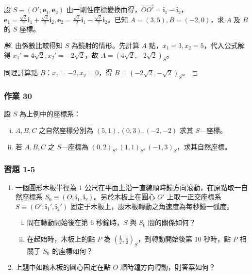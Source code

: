 \begin{example}[例 12]
設 $S \equiv (O'; \mathbf{e}_1, \mathbf{e}_2)$ 由一剛性座標變換而得，$\vec{OO'} = \mathbf{i}_1 - \mathbf{i}_2$，$\mathbf{e}_1 = \frac{\sqrt{2}}{2}\mathbf{i}_1 + \frac{\sqrt{2}}{2}\mathbf{i}_2, \mathbf{e}_2 = \frac{\sqrt{2}}{2}\mathbf{i}_1 - \frac{\sqrt{2}}{2}\mathbf{i}_2$。已知 $A = (3, 5), B = (-2, 0)$，求 $A$ 及 $B$ 的 $S$ 座標。
\end{example}

\begin{proof}[解]
由係數比較得知 $S$ 為鏡射的情形。先計算 $A$ 點，$x_1 = 3, x_2 = 5$，代入公式解得 $x_1' = 4\sqrt{2}, x_2' = -2\sqrt{2}$，故 $A = (4\sqrt{2}, -2\sqrt{2})_S$。

同理計算點 $B$：$x_1 = -2, x_2 = 0$，得 $B = (-2\sqrt{2}, -\sqrt{2})_S$。
\end{proof}

\subsubsection*{作業 30}
設 $S$ 為上例中的座標系：
\begin{enumerate}[(i)]
  \item $A, B, C$ 之自然座標分別為 $(5, 1), (0, 3), (-2, -2)$ 求其 $S$---座標。
  \item 若 $A, B, C$ 之 $S$---座標為 $(0, 2)_S, (1, 1)_S, (-1, 3)_S$，求其自然座標。
\end{enumerate}

\subsubsection*{習題 1-5}
\begin{enumerate}
  \item 一個圓形木板半徑為 $1$ 公尺在平面上沿一直線順時鐘方向滾動，在原點取一自然座標系 $S_0 \equiv (O; \mathbf{i}_1, \mathbf{i}_2)$。另於木板上在圓心 $O'$ 上取一正交座標系 $S \equiv (O'; \mathbf{i}_1', \mathbf{i}_2')$ 固定于木板上，設木板轉動之角速度為每秒鐘一弧度。
  \begin{enumerate}[(i)]
    \item 問在轉動開始後在第 $6$ 秒鐘時，$S$ 與 $S_0$ 間的關係如何？
    \item 在起始時，木板上的點 $P$ 為 $(\frac{1}{2}, \frac{1}{2})_S$，到轉動開始後第 $10$ 秒時，點 $P$ 相關于 $S_0$ 的座標如何？
  \end{enumerate}

  \item 上題中如該木板的圓心固定在點 $O$ 順時鐘方向轉動，則答案如何？
\end{enumerate}

